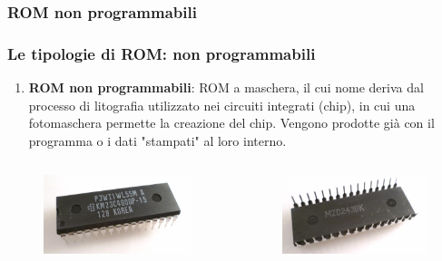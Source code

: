 \subsubsection[ROM non programmabili]{ROM non programmabili}
\begin{frame}
	\frametitle{Le tipologie di ROM: non programmabili}
	  
	\begin{block}{}
		
		\begin{enumerate}
			\item \textbf{ROM non programmabili}: ROM a maschera, il cui nome deriva dal processo di litografia utilizzato nei circuiti integrati (chip), in cui una fotomaschera permette la creazione del chip. Vengono prodotte già con il programma o i dati "stampati" al loro interno.
		\end{enumerate}
	\end{block}
	
	\begin{columns}			
		\begin{figure}[!htbp]
			\centering 
			\includegraphics[width=1.0\linewidth]{images/5_memory/rom_mask_top.jpeg}
		\end{figure}
		
		\begin{figure}[!htbp]
			\centering 
			\includegraphics[width=1.0\linewidth]{images/5_memory/rom_mask_bottom.jpeg}
		\end{figure}
	\end{columns}
	
\end{frame}


